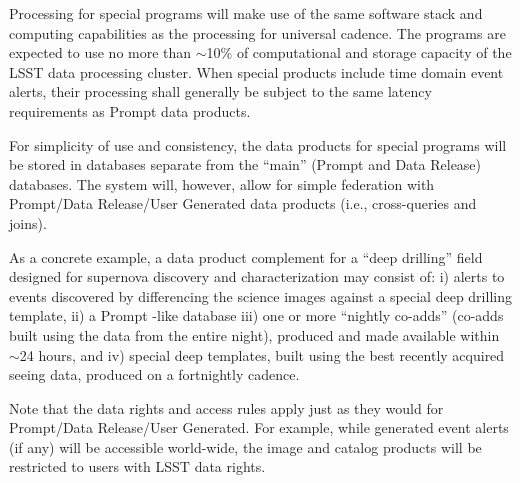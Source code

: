 Processing for special programs will make use of the same software stack and computing capabilities as the processing for universal cadence. The programs are expected to use no more than $\sim$10\% of computational and storage capacity of the LSST data processing cluster. When special products include time domain event alerts, their processing shall generally be subject to the same latency requirements as Prompt data products.

For simplicity of use and consistency, the data products for special programs will be stored in databases separate from the ``main'' (Prompt and Data Release) databases. The system will, however, allow for simple federation with Prompt/Data Release/User Generated data products (i.e., cross-queries and joins).

As a concrete example, a data product complement for a ``deep drilling'' field designed for supernova discovery and characterization may consist of: i) alerts to events discovered by differencing the science images against a special deep drilling template, ii) a Prompt -like database iii) one or more ``nightly co-adds'' (co-adds built using the data from the entire night), produced and made available within $\sim$24 hours, and iv) special deep templates, built using the best recently acquired seeing data, produced on a fortnightly cadence.

Note that the data rights and access rules apply just as they would for Prompt/Data Release/User Generated. For example, while generated event alerts (if any) will be accessible world-wide, the image and catalog products will be restricted to users with LSST data rights.